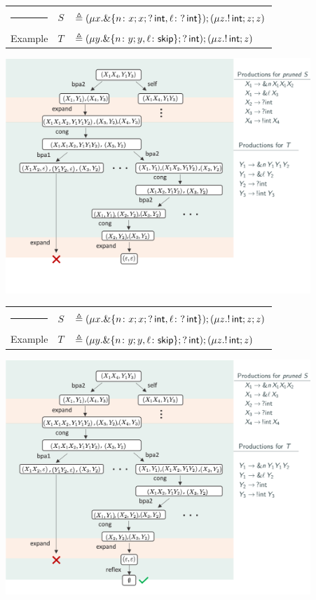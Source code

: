 \message{ !name(main.tex)}\documentclass[10pt]{beamer}
\begin{document}
\begin{frame}
	\begin{tabular} {l l l }
  		{\color{teal}\rule{3cm}{2pt}} &  $S$ &$\triangleq (\mu x. \&\{n\colon x;x;?\,\mathsf{int},
      \ell\colon ?\,\mathsf{int} \});( \mu z. !\,\mathsf{int}; z;z )$\\
  		{\color{teal} Example}  &  $T$ &$\triangleq (\mu y. \&\{n\colon y;y,
      \ell\colon \mathsf{skip} \}; ?\,\mathsf{int}); (\mu z. !\,\mathsf{int}; z)$
	\end{tabular}
	\vspace*{2mm}
	\includegraphics[width=11.5cm]{img/exemplo-1}\smallskip
\end{frame}

\begin{frame}
	\begin{tabular} {l l l }
  		{\color{teal}\rule{3cm}{2pt}} &  $S$ &$\triangleq (\mu x. \&\{n\colon x;x;?\,\mathsf{int},
      \ell\colon ?\,\mathsf{int} \});( \mu z. !\,\mathsf{int}; z;z )$\\
  		{\color{teal} Example}  &  $T$ &$\triangleq (\mu y. \&\{n\colon y;y,
      \ell\colon \mathsf{skip} \}; ?\,\mathsf{int}); (\mu z. !\,\mathsf{int}; z)$
	\end{tabular}
	\vspace*{2mm}
	\includegraphics[width=11.5cm]{img/example_expansion_tree}\smallskip
\end{frame}
\end{document}
